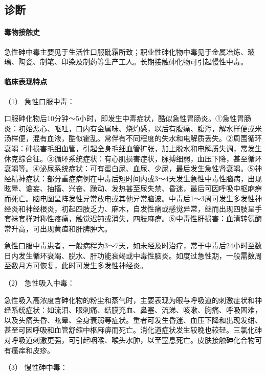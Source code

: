 \subsection{诊断}

\paragraph{毒物接触史}

急性砷中毒主要见于生活性口服砒霜所致；职业性砷化物中毒见于金属冶炼、玻璃、陶瓷、制笔、印染及制药等生产工人。长期接触砷化物可引起慢性中毒。

\paragraph{临床表现特点}

\hypertarget{text00160.htmlux5cux23CHP5-6-4-1-2-2-1}{}
（1） 急性口服中毒：

口服砷化物后10分钟～5小时，即发生中毒症状，酷似急性胃肠炎。①急性胃肠炎：初始恶心、呕吐，口内有金属味、烧灼感，以后有腹痛、腹泻，解水样便或米汤样便，混有血液，酷似霍乱。常伴有不同程度的失水和电解质丢失。②周围循环衰竭：砷损害毛细血管，引起全身毛细血管扩张，加上脱水和电解质失调，常发生休克综合征。③循环系统症状：有心肌损害症状，脉搏细弱，血压下降，甚至循环衰竭等。④泌尿系统症状：可有蛋白尿、血尿、少尿，最后发生急性肾衰竭。⑤神经精神症状：部分重症病例在中毒后短时间内或3～4天发生急性中毒性脑病，出现眩晕、谵妄、抽搐、兴奋、躁动、发热甚至尿失禁、昏迷，最后可因呼吸中枢麻痹而死亡。脑电图呈阵发性异常放电或其他异常脑波。中毒后1～3周可发生多发性神经炎和神经根炎，初起四肢乏力、麻木，自发性痛或感觉异常，继而出现四肢呈手套袜套样对称性疼痛，触觉迟钝或消失，四肢麻痹。⑥中毒性肝损害：血清转氨酶常升高，可出现黄疸和肝脾肿大。

急性口服中毒患者，一般病程为3～7天，如未经及时治疗，常于中毒后24小时至数日内发生循环衰竭、脱水、肝功能衰竭或中毒性脑炎。如度过急性期，一般需数周至数月方可恢复，此时可发生多发性神经炎。

\hypertarget{text00160.htmlux5cux23CHP5-6-4-1-2-2-2}{}
（2） 急性吸入中毒：

急性吸入高浓度含砷化物的粉尘和蒸气时，主要表现为眼与呼吸道的刺激症状和神经系统症状：如流泪、眼刺痛、结膜充血、鼻塞、流涕、咳嗽、胸痛、呼吸困难，以及头痛头昏、眩晕、全身衰弱等症状。重者可发生昏迷、血压下降和出现发绀、甚至可因呼吸和血管舒缩中枢麻痹而死亡。消化道症状发生较晚也较轻。三氯化砷对呼吸道刺激更强，可引起咽喉、喉头水肿，以至窒息死亡。皮肤接触砷化合物可有瘙痒和皮疹。

\hypertarget{text00160.htmlux5cux23CHP5-6-4-1-2-2-3}{}
（3） 慢性砷中毒：

